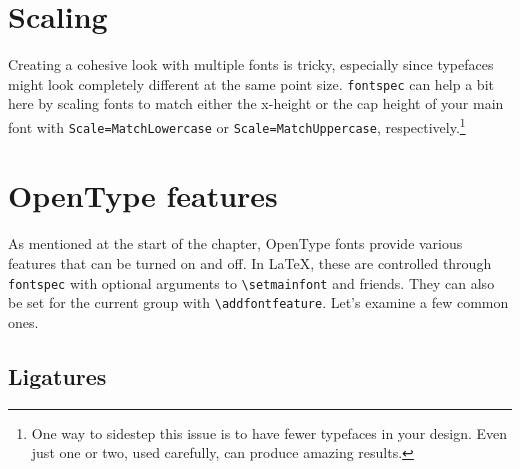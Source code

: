 \section{Scaling}

Creating a cohesive look with multiple fonts is tricky,
especially since typefaces might look completely different
at the same point size.
\texttt{fontspec} can help a bit here by scaling fonts to match either the
x-height or the cap height of your main font with
\verb|Scale=MatchLowercase| or \verb|Scale=MatchUppercase|,
respectively.\footnote{One way to sidestep this issue is to have fewer
typefaces in your design. Even just one or two,
used carefully, can produce amazing results.}


\section{OpenType features}

As mentioned at the start of the chapter,
OpenType fonts provide various features that can be turned on and off.
In \LaTeX{}, these are controlled through \texttt{fontspec}
with optional arguments to \verb|\setmainfont| and friends.
They can also be set for the current group with
\verb|\addfontfeature|.
Let's examine a few common ones.

\subsection{Ligatures}

